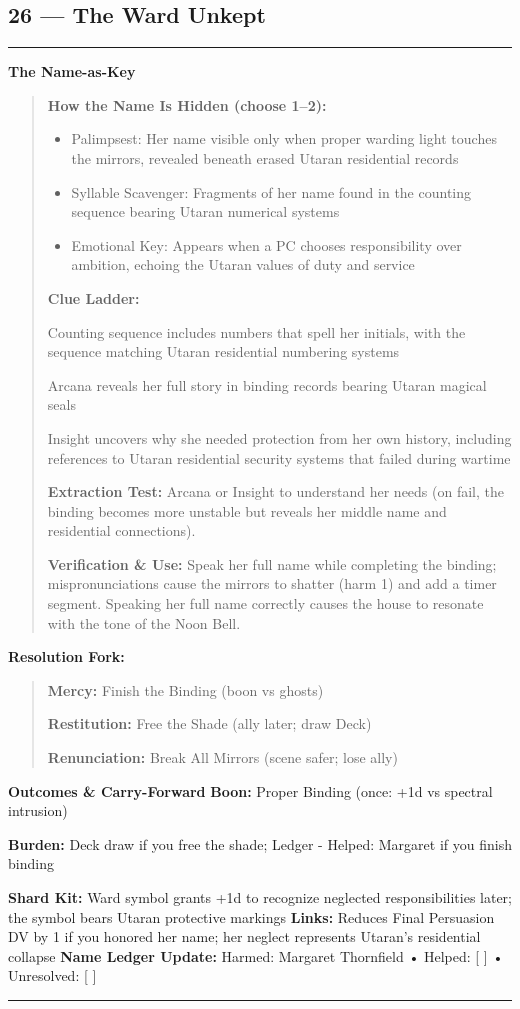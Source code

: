 \documentclass[18pt, letterpaper, twoside]{article}
\newenvironment{floorbox}[1]{%
    \begin{center}
    \begin{minipage}{0.95\textwidth}
    \subsection*{#1}
    \vspace{-0.5em}
    \rule{\textwidth}{0.5pt}
    \vspace{0.5em}
}{%
    \vspace{0.5em}
    \rule{\textwidth}{0.5pt}
    \end{minipage}
    \end{center}
}
\newenvironment{gmnote}[1]{%
    \vspace{0.5em}
    \noindent\textbf{#1}
    \begin{quote}
}{%
    \end{quote}
    \vspace{0.5em}
}
\newenvironment{resolutionbox}{%
    \vspace{0.5em}
    \noindent\textbf{Resolution Fork:}
    \begin{quote}
}{%
    \end{quote}
    \vspace{0.5em}
}
\newcommand{\boon}[1]{\noindent\textbf{Boon:} #1\par}
\newcommand{\burden}[1]{\noindent\textbf{Burden:} #1\par}
\begin{document}
\begin{floorbox}{26 --- The Ward Unkept}
\begin{gmnote}{The Name-as-Key}
\textbf{How the Name Is Hidden (choose 1--2):}
\begin{itemize}[leftmargin=*]
    \item Palimpsest: Her name visible only when proper warding light touches the mirrors, revealed beneath erased Utaran residential records
    \item Syllable Scavenger: Fragments of her name found in the counting sequence bearing Utaran numerical systems
    \item Emotional Key: Appears when a PC chooses responsibility over ambition, echoing the Utaran values of duty and service
\end{itemize}

\textbf{Clue Ladder:}
\begin{description}[leftmargin=*, style=unboxed]
    \item[Gentle Nudge:] Counting sequence includes numbers that spell her initials, with the sequence matching Utaran residential numbering systems
    \item[Actionable Lead:] Arcana reveals her full story in binding records bearing Utaran magical seals
    \item[Aha! Proof:] Insight uncovers why she needed protection from her own history, including references to Utaran residential security systems that failed during wartime
\end{description}

\textbf{Extraction Test:} Arcana or Insight to understand her needs (on fail, the binding becomes more unstable but reveals her middle name and residential connections).

\textbf{Verification \& Use:} Speak her full name while completing the binding; mispronunciations cause the mirrors to shatter (harm 1) and add a timer segment. Speaking her full name correctly causes the house to resonate with the tone of the Noon Bell.
\end{gmnote}

\begin{resolutionbox}
\textbf{Mercy:} Finish the Binding (boon vs ghosts)

\textbf{Restitution:} Free the Shade (ally later; draw Deck)

\textbf{Renunciation:} Break All Mirrors (scene safer; lose ally)
\end{resolutionbox}

\textbf{Outcomes \& Carry-Forward}
\boon{Proper Binding (once: +1d vs spectral intrusion)}
\burden{Deck draw if you free the shade; Ledger - Helped: Margaret if you finish binding}
\textbf{Shard Kit:} Ward symbol grants +1d to recognize neglected responsibilities later; the symbol bears Utaran protective markings
\textbf{Links:} Reduces Final Persuasion DV by 1 if you honored her name; her neglect represents Utaran's residential collapse
\textbf{Name Ledger Update:} Harmed: Margaret Thornfield • Helped: [ ] • Unresolved: [ ]


\end{floorbox}
\end{document}
